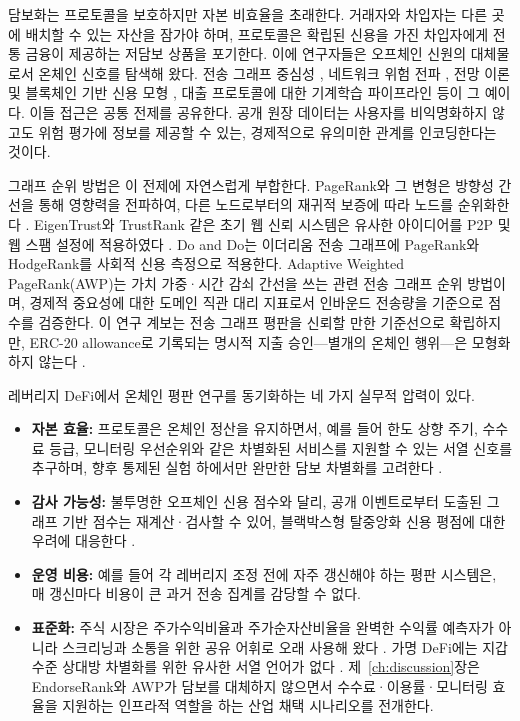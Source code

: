 담보화는 프로토콜을 보호하지만 자본 비효율을 초래한다. 거래자와 차입자는 다른 곳에 배치할 수 있는 자산을 잠가야 하며, 프로토콜은 확립된 신용을 가진 차입자에게 전통 금융이 제공하는 저담보 상품을 포기한다. 이에 연구자들은 오프체인 신원의 대체물로서 온체인 신호를 탐색해 왔다. 전송 그래프 중심성 , 네트워크 위험 전파 , 전망 이론 및 블록체인 기반 신용 모형 , 대출 프로토콜에 대한 기계학습 파이프라인  등이 그 예이다. 이들 접근은 공통 전제를 공유한다. 공개 원장 데이터는 사용자를 비익명화하지 않고도 위험 평가에 정보를 제공할 수 있는, 경제적으로 유의미한 관계를 인코딩한다는 것이다.

그래프 순위 방법은 이 전제에 자연스럽게 부합한다. PageRank와 그 변형은 방향성 간선을 통해 영향력을 전파하여, 다른 노드로부터의 재귀적 보증에 따라 노드를 순위화한다 . EigenTrust와 TrustRank 같은 초기 웹 신뢰 시스템은 유사한 아이디어를 P2P 및 웹 스팸 설정에 적용하였다 . Do and Do는 이더리움 전송 그래프에 PageRank와 HodgeRank를 사회적 신용 측정으로 적용한다. Adaptive Weighted PageRank(AWP)는 가치 가중·시간 감쇠 간선을 쓰는 관련 전송 그래프 순위 방법이며, 경제적 중요성에 대한 도메인 직관 대리 지표로서 인바운드 전송량을 기준으로 점수를 검증한다. 이 연구 계보는 전송 그래프 평판을 신뢰할 만한 기준선으로 확립하지만, ERC-20 allowance로 기록되는 명시적 지출 승인---별개의 온체인 행위---은 모형화하지 않는다 .


레버리지 DeFi에서 온체인 평판 연구를 동기화하는 네 가지 실무적 압력이 있다.
\begin{itemize}
\item \textbf{자본 효율:} 프로토콜은 온체인 정산을 유지하면서, 예를 들어 한도 상향 주기, 수수료 등급, 모니터링 우선순위와 같은 차별화된 서비스를 지원할 수 있는 서열 신호를 추구하며, 향후 통제된 실험 하에서만 완만한 담보 차별화를 고려한다 .
\item \textbf{감사 가능성:} 불투명한 오프체인 신용 점수와 달리, 공개 이벤트로부터 도출된 그래프 기반 점수는 재계산·검사할 수 있어, 블랙박스형 탈중앙화 신용 평점에 대한 우려에 대응한다 .
\item \textbf{운영 비용:} 예를 들어 각 레버리지 조정 전에 자주 갱신해야 하는 평판 시스템은, 매 갱신마다 비용이 큰 과거 전송 집계를 감당할 수 없다.
\item \textbf{표준화:} 주식 시장은 주가수익비율과 주가순자산비율을 완벽한 수익률 예측자가 아니라 스크리닝과 소통을 위한 공유 어휘로 오래 사용해 왔다 . 가명 DeFi에는 지갑 수준 상대방 차별화를 위한 유사한 서열 언어가 없다 . 제~\ref{ch:discussion}장은 EndorseRank와 AWP가 담보를 대체하지 않으면서 수수료·이용률·모니터링 효율을 지원하는 인프라적 역할을 하는 산업 채택 시나리오를 전개한다.
\end{itemize}


